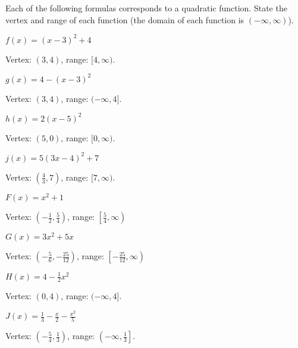 \begin{exercises}
\begin{problem}
\end{problem}
\begin{problem}
Each of the following formulas corresponds to a quadratic function. 
State the vertex and range of each function (the domain of 
each function is $(-\infty,\infty)$).
\begin{multicols}{4}
	\begin{subproblem}
		$f(x)=(x-3)^2+4$ 
		\begin{shortsolution}
			Vertex: $(3,4)$, range: $[4,\infty)$.
		\end{shortsolution}
	\end{subproblem}
	\begin{subproblem}
		$g(x)=4-(x-3)^2$ 
		\begin{shortsolution}
			Vertex: $(3,4)$, range: $(-\infty,4]$. 
		\end{shortsolution}
	\end{subproblem}
	\begin{subproblem}
		$h(x)=2(x-5)^2$ 
		\begin{shortsolution}
			Vertex: $(5,0)$, range: $[0,\infty)$.
		\end{shortsolution}
	\end{subproblem}
	\begin{subproblem}
		$j(x)=5(3x-4)^2+7$ 
		\begin{shortsolution}
			Vertex: $\left( \frac{4}{3},7 \right)$, range: $[7,\infty)$. 
		\end{shortsolution}
	\end{subproblem}
	\begin{subproblem}
		$F(x)=x^2+1$ 
		\begin{shortsolution}
			Vertex: $\left( -\frac{1}{2},\frac{5}{4} \right)$, range: $\left[ \frac{5}{4},\infty \right)$
		\end{shortsolution}
	\end{subproblem}
	\begin{subproblem}
		$G(x)=3x^2+5x$ 
		\begin{shortsolution}
			Vertex: $\left( -\frac{5}{6},-\frac{25}{12} \right)$, range: $\left[ -\frac{25}{12},\infty\right)$ 
		\end{shortsolution}
	\end{subproblem}
	\begin{subproblem}
		$H(x)=4-\frac{1}{2}x^2$ 
		\begin{shortsolution}
			Vertex: $(0,4)$, range: $(-\infty,4]$. 
		\end{shortsolution}
	\end{subproblem}
	\begin{subproblem}
		$J(x)=\frac{1}{3}-\frac{x}{2}-\frac{x^2}{5}$ 
		\begin{shortsolution}
			Vertex: $\left( -\frac{5}{4},\frac{1}{3} \right)$, range: $\left( -\infty,\frac{1}{3} \right]$.
		\end{shortsolution}
	\end{subproblem}
\end{multicols}
\end{problem}
  

\end{exercises}
